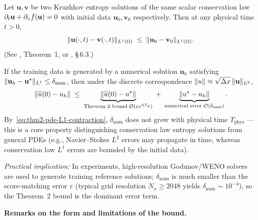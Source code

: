 \begin{proposition}
Let $\mathbf{u}, \mathbf{v}$ be two Kruzhkov entropy solutions of the same scalar conservation law $\partial_{t} \mathbf{u} + \partial_{x} f(\mathbf{u}) = 0$ with initial data $\mathbf{u}_{0}, \mathbf{v}_{0}$ respectively. Then at any physical time $t > 0$,
\begin{equation}
\lVert \mathbf{u}(\cdot, t) - \mathbf{v}(\cdot, t) \rVert_{L^{1}(\Omega)}
\;\le\;
\lVert \mathbf{u}_{0} - \mathbf{v}_{0} \rVert_{L^{1}(\Omega)}.
\label{eq:thm2-pde-L1-contraction}
\end{equation}
(See \citet{kruzhkov1970}, Theorem~1, or \citet{dafermos2016hyperbolic}, \S\,6.3.)
\end{proposition}

\begin{corollary}
If the training data is generated by a numerical solution $\mathbf{u}_{h}$ satisfying $\lVert \mathbf{u}_{h} - \mathbf{u}^{\star} \rVert_{L^{1}} \le \delta_{\mathrm{num}}$, then under the discrete correspondence $\lVert u \rVert \approx \sqrt{\Delta x}\,\lVert \mathbf{u} \rVert_{L^{2}}$,
\begin{equation}
\lVert \widehat{u}(0) - u_{h} \rVert
\;\le\;
\underbrace{\lVert \widehat{u}(0) - u^{\star} \rVert}_{\text{Theorem~2 bound}\; \mathcal{O}(\varepsilon e^{\Lambda T_{d}})}
\;+\;
\underbrace{\lVert u^{\star} - u_{h} \rVert}_{\text{numerical error}\; \mathcal{O}(\delta_{\mathrm{num}})}.
\label{eq:thm2-pde-transfer}
\end{equation}
By~\eqref{eq:thm2-pde-L1-contraction}, $\delta_{\mathrm{num}}$ does not grow with physical time $T_{\mathrm{phys}}$ --- this is a core property distinguishing conservation law entropy solutions from general PDEs (e.g., Navier--Stokes $L^{2}$ errors may propagate in time, whereas conservation law $L^{1}$ errors are bounded by the initial data).

\textit{Practical implication:} In experiments, high-resolution Godunov/WENO solvers are used to generate training reference solutions; $\delta_{\mathrm{num}}$ is much smaller than the score-matching error $\varepsilon$ (typical grid resolution $N_{x} \ge 2048$ yields $\delta_{\mathrm{num}} \sim 10^{-4}$), so the Theorem~2 bound is the dominant error term.
\end{corollary}

\medskip
\noindent
\textbf{Remarks on the form and limitations of the bound.}

